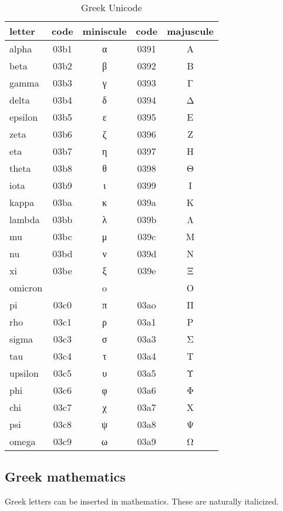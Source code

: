 \documentclass[10pt, letterpaper, twoside]{article}
\begin{document}
\begin{table}[H]
\begin{flushleft}
\begin{tabular}{lcccc}
\toprule
letter & code & miniscule & code & majuscule \\
\midrule
alpha   & 03b1 & α & 0391 & Α \\
beta    & 03b2 & β & 0392 & Β \\
gamma   & 03b3 & γ & 0393 & Γ \\
delta   & 03b4 & δ & 0394 & Δ \\
epsilon & 03b5 & ε & 0395 & Ε \\
zeta    & 03b6 & ζ & 0396 & Ζ \\
eta     & 03b7 & η & 0397 & Η \\
theta   & 03b8 & θ & 0398 & Θ \\
iota    & 03b9 & ι & 0399 & Ι \\
kappa   & 03ba & κ & 039a & Κ \\
lambda  & 03bb & λ & 039b & Λ \\
mu      & 03bc & μ & 039c & Μ \\
nu      & 03bd & ν & 039d & Ν \\
xi      & 03be & ξ & 039e & Ξ \\
omicron &      & o &      & O \\
pi      & 03c0 & π & 03ao & Π \\
rho     & 03c1 & ρ & 03a1 & Ρ \\
sigma   & 03c3 & σ & 03a3 & Σ \\
tau     & 03c4 & τ & 03a4 & Τ \\
upsilon & 03c5 & υ & 03a5 & Υ \\
phi     & 03c6 & φ & 03a6 & Φ \\
chi     & 03c7 & χ & 03a7 & Χ \\
psi     & 03c8 & ψ & 03a8 & Ψ \\
omega   & 03c9 & ω & 03a9 & Ω \\
\bottomrule
\end{tabular}
\label{tab:greek_unicode}
\caption{Greek Unicode}
\end{flushleft}
\end{table}

\newpage
\subsection{Greek mathematics}\label{sec:greek_mathematics}

Greek letters can be inserted in mathematics. These are naturally italicized.
\end{document}
